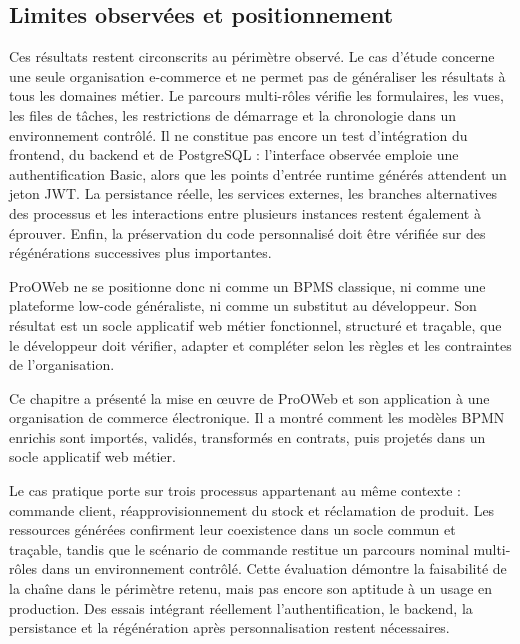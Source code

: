 \subsection*{Limites observées et positionnement}
Ces résultats restent circonscrits au périmètre observé. Le cas d'étude concerne
une seule organisation e-commerce et ne permet pas de généraliser les résultats à
tous les domaines métier. Le parcours multi-rôles vérifie les formulaires, les
vues, les files de tâches, les restrictions de démarrage et la chronologie dans
un environnement contrôlé. Il ne constitue pas encore un test d'intégration du
frontend, du backend et de PostgreSQL : l'interface observée emploie une
authentification Basic, alors que les points d'entrée runtime générés attendent un
jeton JWT. La persistance réelle, les services externes, les branches alternatives
des processus et les interactions entre plusieurs instances restent également à
éprouver. Enfin, la préservation du code personnalisé doit être vérifiée sur des
régénérations successives plus importantes.

ProOWeb ne se positionne donc ni comme un BPMS classique, ni comme une plateforme
low-code généraliste, ni comme un substitut au développeur. Son résultat est
un socle applicatif web métier fonctionnel, structuré et traçable, que le
développeur doit vérifier, adapter et compléter selon les règles et les
contraintes de l'organisation.

Ce chapitre a présenté la mise en œuvre de ProOWeb et son application à une
organisation de commerce électronique. Il a montré comment les modèles BPMN
enrichis sont importés, validés, transformés en contrats, puis projetés dans un
socle applicatif web métier.

Le cas pratique porte sur trois processus appartenant au même contexte : commande
client, réapprovisionnement du stock et réclamation de produit. Les ressources
générées confirment leur coexistence dans un socle commun et traçable, tandis que
le scénario de commande restitue un parcours nominal multi-rôles dans un
environnement contrôlé. Cette évaluation démontre la faisabilité de la chaîne dans
le périmètre retenu, mais pas encore son aptitude à un usage en production. Des
essais intégrant réellement l'authentification, le backend, la persistance et la
régénération après personnalisation restent nécessaires.
